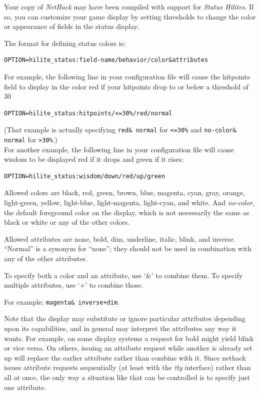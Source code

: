 \documentclass[titlepage]{article}
\begin{document}
Your copy of \textit{NetHack} may have been compiled with support
for \textit{Status Hilites}.
If so, you can customize your game display by setting thresholds to
change the color or appearance of fields in the status display.

The format for defining status colors is:\\
\begin{verbatim}
OPTION=hilite_status:field-name/behavior/color&attributes
\end{verbatim}

For example, the following line in your configuration file will cause
the hitpoints field to display in the color red if your hitpoints
drop to or below a threshold of 30%
\begin{verbatim}
OPTION=hilite_status:hitpoints/<=30%/red/normal
\end{verbatim}
(That example is actually specifying \texttt{red\& normal} for  \texttt{<=30\%}
and \texttt{no-color\& normal} for \texttt{>30\%}.)\\

For another example, the following line in your configuration file will cause
wisdom to be displayed red if it drops and green if it rises:\\
\begin{verbatim}
OPTION=hilite_status:wisdom/down/red/up/green
\end{verbatim}

Allowed colors are black, red, green, brown, blue, magenta, cyan, gray,
orange, light-green, yellow, light-blue, light-magenta, light-cyan, and white.
And \textit{no-color}, the default foreground color on the display, which
is not necessarily the same as black or white or any of the other colors.

Allowed attributes are none, bold, dim, underline, italic, blink, and inverse.
``Normal'' is a synonym for ``none''; they should not be used in
combination with any of the other attributes.

To specify both a color and an attribute, use `\&' to combine them.
To specify multiple attributes, use `+' to combine those.

For example: \texttt{magenta\& inverse+dim}.

Note that the display may substitute or ignore particular attributes
depending upon its capabilities, and in general may interpret the
attributes any way it wants.
For example, on some display systems a request for bold might yield
blink or vice versa.
On others, issuing an attribute request while another is already
set up will replace the earlier attribute rather than combine with it.
Since nethack issues attribute requests sequentially (at least with
the \textit{tty} interface) rather than all at once, the only way a
situation like that can be controlled is to specify just one attribute.
\end{document}
